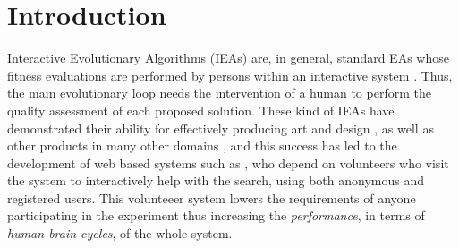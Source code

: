 \documentclass[conference]{IEEEtran}
\begin{document}
\IEEEpeerreviewmaketitle



\section{Introduction}
Interactive Evolutionary Algorithms (IEAs) are, in general, standard EAs whose
fitness evaluations are performed by persons within an interactive 
system \cite{eiben2015interactive}.  Thus, the main evolutionary loop needs the intervention of a
human to perform the quality assessment of each proposed solution.
These kind of IEAs have demonstrated their ability for effectively
producing art and design \cite{Bentley:1999:intro,Sims:1991,todd:1992},
as well as other products in many other domains \cite{ie1}, and this
success has led to the development of web based systems such as \cite{picbreeder},
who depend on volunteers who visit the system to interactively help
with the search, using both anonymous and registered users. This
volunteeer system lowers the requirements of anyone participating in
the experiment thus increasing the {\em performance}, in terms of {\em
  human brain cycles}, of the whole system.
\end{document}
